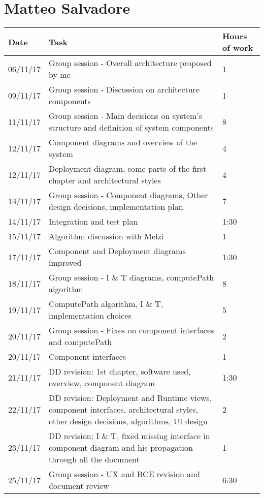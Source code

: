 \section{Matteo Salvadore}
\begin{table}[H]
	\begin{tabular}{ p{2cm} p{10cm} p{3cm}}
	Date & Task & Hours of work\\
	\hline
	06/11/17 & Group session - Overall architecture proposed by me & 1 \\
	09/11/17 & Group session - Discussion on architecture components & 1 \\
	11/11/17 & Group session - Main decisions on system's structure and definition of system components & 8 \\
	12/11/17 & Component diagrams and overview of the system & 4 \\
	12/11/17 & Deployment diagram, some parts of the first chapter and architectural styles & 4 \\
	13/11/17 & Group session - Component diagrams, Other design decisions, implementation plan & 7 \\
	14/11/17 & Integration and test plan & 1:30 \\
	15/11/17 & Algorithm discussion with Melzi & 1 \\
	17/11/17 & Component and Deployment diagrams improved & 1:30 \\
	18/11/17 & Group session - I \& T diagrams, computePath algorithm & 8 \\
	19/11/17 & ComputePath algorithm, I \& T, implementation choices & 5 \\
	20/11/17 & Group session - Fixes on component interfaces and computePath & 2 \\
	20/11/17 & Component interfaces & 1 \\
	21/11/17 & DD revision: 1st chapter, software used, overview, component diagram & 1:30 \\
	22/11/17 & DD revision: Deployment and Runtime views, component interfaces, architectural styles, other design decisions, algorithms, UI design & 2 \\
	23/11/17 & DD revision: I \& T, fixed missing interface in component diagram and his propagation through all the document& 1 \\
	25/11/17 & Group session - UX and BCE revision and document review & 6:30 \\
	\end{tabular}
\end{table}